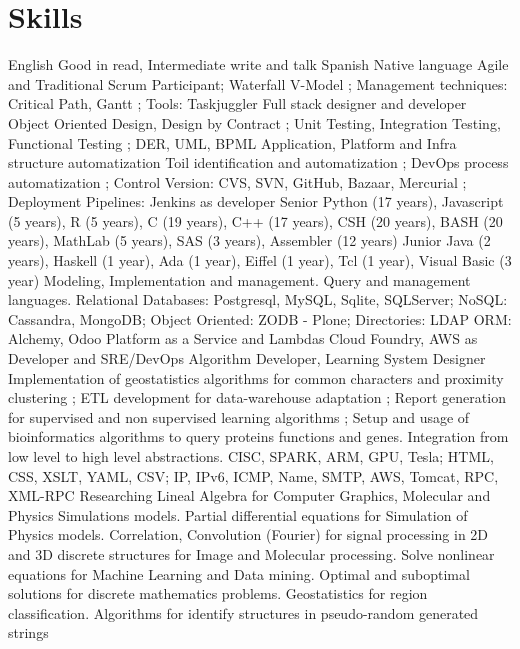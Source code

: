 \documentclass[9pt,a4paper,sans]{moderncv}
\begin{document}
\section{Skills}
        {English}
        {Good in read, Intermediate write and talk}
        {}
        {}
        {}
\cventry{}
        {Spanish}
        {Native language}
        {}
        {}
        {}
        {Agile and Traditional}
	{}
        {Scrum Participant; Waterfall V-Model ; Management techniques: Critical Path, Gantt ; Tools: Taskjuggler}
	{}
	{}
	{}
	{Full stack designer and developer}
        {Object Oriented Design, Design by Contract ; Unit Testing, Integration Testing, Functional Testing ; DER, UML, BPML}
        {}
        {}
        {}
        {}
        {Application, Platform and Infra structure automatization}
        {Toil identification and automatization ; DevOps process automatization ; Control Version: CVS, SVN, GitHub, Bazaar, Mercurial ; Deployment Pipelines: Jenkins as developer}
        {}
        {}
        {}
        {}
        {Senior}
        {Python (17 years), Javascript (5 years), R (5 years), C (19 years), C++ (17 years), CSH (20 years), BASH (20 years), MathLab (5 years), SAS (3 years), Assembler (12 years)}
        {}
        {}
        {}
\cventry{}
        {Junior}
        {Java (2 years), Haskell (1 year), Ada (1 year), Eiffel (1 year), Tcl (1 year), Visual Basic (3 year)}
        {}
        {}
        {}
        {Modeling, Implementation and management. Query and management languages.}
        {Relational Databases: Postgresql, MySQL, Sqlite, SQLServer; NoSQL: Cassandra, MongoDB; Object Oriented: ZODB - Plone; Directories: LDAP}
        {ORM: Alchemy, Odoo}
        {}
        {}
        {Platform as a Service and Lambdas}
	{Cloud Foundry, AWS as Developer and SRE/DevOps}
        {}
        {}
        {}
	{Algorithm Developer, Learning System Designer}
	{Implementation of geostatistics algorithms for common characters and proximity clustering ; ETL development for data-warehouse adaptation ; Report generation for supervised and non supervised learning algorithms ; Setup and usage of bioinformatics algorithms to query proteins functions and genes. }
        {}
        {}
        {}
        {}
        {Integration from low level to high level abstractions.}
        {CISC, SPARK, ARM, GPU, Tesla; HTML, CSS, XSLT, YAML, CSV; IP, IPv6, ICMP, Name, SMTP, AWS, Tomcat, RPC, XML-RPC}
        {}
        {}
        {}
	{Researching}
	{Lineal Algebra for Computer Graphics, Molecular and Physics Simulations models. Partial differential equations for Simulation of Physics models. Correlation, Convolution (Fourier) for signal processing in 2D and 3D discrete structures for Image and Molecular processing. Solve nonlinear equations for Machine Learning and Data mining. Optimal and suboptimal solutions for discrete mathematics problems. Geostatistics for region classification. Algorithms for identify structures in pseudo-random generated strings}
	{}
	{}
	{}
\end{document}
